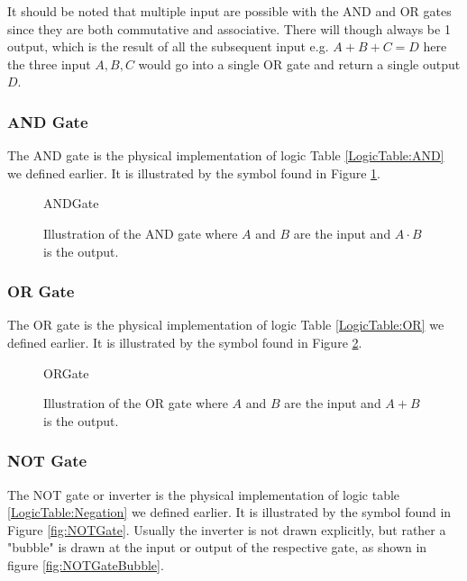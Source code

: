             It should be noted that multiple input are possible with the AND and OR gates since they are both commutative and associative. There will though always be 1 output, which is the result of all the subsequent input e.g. $A+B+C=D$ here the three input $A,B,C$ would go into a single OR gate and return a single output $D$.
            
            \subsubsection{AND Gate}
                The AND gate is the physical implementation of logic Table \ref{LogicTable:AND} we defined earlier. It is illustrated by the symbol found in Figure \ref{fig:ANDGate}. 
                
                \begin{figure}[h!]
                    \centering
                    {ANDGate}
                    \caption{Illustration of the AND gate where $A$ and $B$ are the input and $A\cdot B$ is the output.}
                    \label{fig:ANDGate}
                \end{figure}
            
            \subsubsection{OR Gate}
            
                The OR gate is the physical implementation of logic Table \ref{LogicTable:OR} we defined earlier. It is illustrated by the symbol found in Figure \ref{fig:ORGate}. 
                
                \begin{figure}[h!]
                    \centering
                    {ORGate}
                    \caption{Illustration of the OR gate where $A$ and $B$ are the input and $A+B$ is the output.}
                    \label{fig:ORGate}
                \end{figure} 
            
            \subsubsection{NOT Gate}
            
                The NOT gate or inverter is the physical implementation of logic table \ref{LogicTable:Negation} we defined earlier. It is illustrated by the symbol found in Figure \ref{fig:NOTGate}. Usually the inverter is not drawn explicitly, but rather a "bubble" is drawn at the input or output of the respective gate, as shown in figure \ref{fig:NOTGateBubble}. 
                
